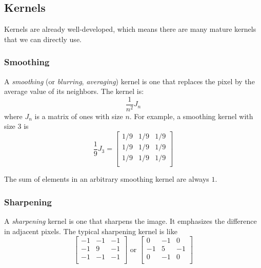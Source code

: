 \documentclass{note}
\begin{document}
\subsection{Kernels}

Kernels are already well-developed, which means there are many mature kernels that we can directly use.

\subsubsection{Smoothing}

A \textit{smoothing} (or \textit{blurring}, \textit{averaging}) kernel is one that replaces the pixel by the average value of its neighbors. The kernel is: 
\begin{equation*}
    \frac{1}{n^2} J_n
\end{equation*}
where $J_n$ is a matrix of ones with size $n$. For example, a smoothing kernel with size $3$ is
\begin{equation*}
    \frac{1}{9} J_3 = \begin{bmatrix}
        1/9 & 1/9 & 1/9 \\
        1/9 & 1/9 & 1/9 \\
        1/9 & 1/9 & 1/9 \\
    \end{bmatrix}
\end{equation*}

\begin{note}
    The sum of elements in an arbitrary smoothing kernel are always $1$.
\end{note}

\subsubsection{Sharpening}

A \textit{sharpening} kernel is one that sharpens the image. It emphasizes the difference in adjacent pixels. The typical sharpening kernel is like
\begin{equation*}
    \begin{bmatrix}
        -1 & -1 & -1 \\
        -1 &  9 & -1 \\
        -1 & -1 & -1 \\
    \end{bmatrix}
    \text{ or }
    \begin{bmatrix}
         0 & -1 &  0 \\
        -1 &  5 & -1 \\
         0 & -1 &  0 \\
    \end{bmatrix}
\end{equation*}
\end{document}
